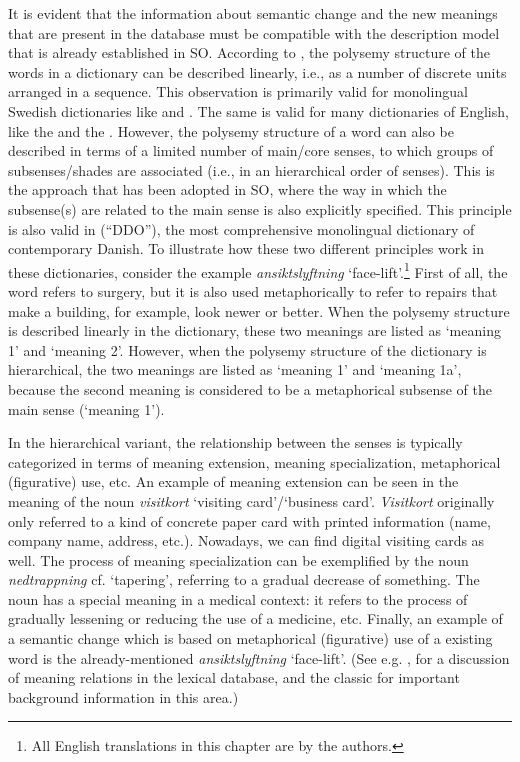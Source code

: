 \documentclass[output=paper]{langscibook}
\begin{document}
It is evident that the information about semantic change and the new meanings that are present in the database must be compatible with the description model that is already established in SO. According to \citet[211--212]{svensen2009}, the polysemy structure of the words in a dictionary can be described linearly, i.e., as a number of discrete units arranged in a sequence. This observation is primarily valid for monolingual Swedish dictionaries like  \citep{messius2006} and  \citep{sjogren2010}. The same is valid for many dictionaries of English, like the  and the . However, the polysemy structure of a word can also be described in terms of a limited number of main/core senses, to which groups of subsenses/shades are associated (i.e., in an hierarchical order of senses). This is the approach that has been adopted in SO, where the way in which the subsense(s) are related to the main sense is also explicitly specified. This principle is also valid in  (``DDO''), the most comprehensive monolingual dictionary of contemporary Danish. To illustrate how these two different principles work in these dictionaries, consider the example \emph{ansiktslyftning} `face-lift'.\footnote{All English translations in this chapter are by the authors.} First of all, the word refers to surgery, but it is also used metaphorically to refer to repairs that make a building, for example, look newer or better. When the polysemy structure is described linearly in the dictionary, these two meanings are listed as `meaning 1' and `meaning 2'. However, when the polysemy structure of the dictionary is hierarchical, the two meanings are listed as `meaning 1' and `meaning 1a', because the second meaning is considered to be a metaphorical subsense of the main sense (`meaning 1'). 

In the hierarchical variant, the relationship between the senses is typically categorized in terms of meaning extension, meaning specialization, metaphorical (figurative) use, etc. An example of meaning extension can be seen in the meaning of the noun \emph{visitkort} `visiting card'/`business card'. \emph{Visitkort} originally only referred to a kind of concrete paper card with printed information (name, company name, address, etc.). Nowadays, we can find digital visiting cards as well. The process of meaning specialization can be exemplified by the noun \emph{nedtrappning} cf. `tapering', referring to a gradual decrease of something. The noun has a special meaning in a medical context: it refers to the process of gradually lessening or reducing the use of a medicine, etc. Finally, an example of a semantic change which is based on metaphorical (figurative) use of a existing word is the already-mentioned \emph{ansiktslyftning} `face-lift'. (See e.g. \citealt[181]{malmgren1988}, for a discussion of meaning relations in the lexical database, and the classic \citealt{waldron1967} for important background information in this area.)
\end{document}
